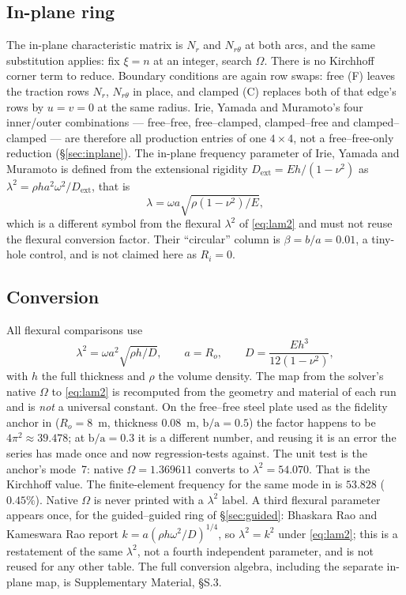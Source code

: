 \documentclass[11pt]{article}
\newcommand{\lamsq}{\lambda^{2}}
\newcommand{\ba}{\mbox{b/a}}
\begin{document}
\subsection{In-plane ring}\label{sec:ipring}
The in-plane characteristic matrix is $N_r$ and $N_{r\theta}$ at both arcs,
and the same substitution applies: fix $\xi=n$ at an integer, search $\Omega$.
There is no Kirchhoff corner term to reduce. Boundary conditions are again
row swaps: free (F) leaves the traction rows $N_r$, $N_{r\theta}$ in place,
and clamped (C) replaces both of that edge's rows by $u=v=0$ at the same
radius. Irie, Yamada and Muramoto's four inner/outer combinations ---
free--free, free--clamped, clamped--free and clamped--clamped --- are
therefore all production entries of one $4\times4$, not a free--free-only
reduction (\S\ref{sec:inplane}). The in-plane frequency parameter
of Irie, Yamada and Muramoto is defined from the extensional rigidity
$D_{\mathrm{ext}}=Eh/(1-\nu^2)$ as
$\lambda^2=\rho h a^2\omega^2/D_{\mathrm{ext}}$, that is
\begin{equation}
\lambda=\omega a\sqrt{\rho(1-\nu^{2})/E},
\label{eq:irielam}
\end{equation}
which is a different symbol from the flexural $\lamsq$ of
\eqref{eq:lam2} and must not reuse the flexural conversion factor. Their
``circular'' column is $\beta=b/a=0.01$, a tiny-hole control, and is not
claimed here as $R_i=0$.

\subsection{Conversion}\label{sec:conv}
All flexural comparisons use
\begin{equation}
\lamsq=\omega a^{2}\sqrt{\rho h/D},\qquad a=R_o,\qquad
D=\frac{Eh^{3}}{12(1-\nu^{2})},
\label{eq:lam2}
\end{equation}
with $h$ the full thickness and $\rho$ the volume density. The map from the solver's native $\Omega$ to
\eqref{eq:lam2} is recomputed from the geometry and material of each run and
is \emph{not} a universal constant. On the free--free steel plate used as the
fidelity anchor in \cite{mccune2026annular} ($R_o=8$~m, thickness $0.08$~m,
$\ba=0.5$) the factor happens to be $4\pi^{2}\approx39.478$; at $\ba=0.3$ it
is a different number, and reusing it is an error the series has made once and
now regression-tests against. The unit test is the anchor's mode~7: native
$\Omega=1.369611$ converts to $\lamsq=54.070$. That is the Kirchhoff
value. The finite-element frequency for the same mode in
\cite{mccune2026annular} is $53.828$ ($0.45\%$). Native $\Omega$ is never printed with a $\lamsq$ label.
A third flexural parameter appears once, for the guided--guided ring of
\S\ref{sec:guided}: Bhaskara Rao and Kameswara Rao \cite{bhaskararao2016}
report $k=a(\rho h\omega^{2}/D)^{1/4}$, so $\lamsq=k^{2}$ under
\eqref{eq:lam2}; this is a restatement of the same $\lamsq$, not a fourth
independent parameter, and is not reused for any other table. The full
conversion algebra, including the separate in-plane map, is Supplementary
Material, \S{}S.3.
\end{document}
